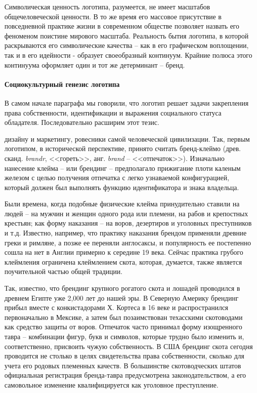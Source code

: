 Символическая ценность логотипа, разумеется, не имеет масштабов общечеловеческой ценности.
В то же время его массовое присутствие в повседневной практике жизни в современном
обществе позволяет назвать его феноменом поистине мирового масштаба. Реальность
бытия логотипа, в которой раскрываются его символические качества -- как в его графическом
воплощении, так и в его идейности - образует своеобразный континуум.
Крайние полюса этого континуума оформляет один и тот же детерминант -- бренд.

\paragraph{Социокультурный генезис логотипа}

В самом начале параграфа мы говорили, что логотип решает задачи закрепления права
собственности, идентификации и выражения социального статуса обладателя.
Последовательно расширим этот тезис.

дизайну и маркетингу, ровесники самой человеческой цивилизации. Так, первым логотипом,
в исторической перспективе, принято считать бренд-клеймо (древ. сканд. \emph{brandr},
<<гореть>>, анг. \emph{brand} -- <<отпечаток>>).
\autocite{markritson}\autocite{colapinto2011}\autocite{tradetimeline}\autocite{zapenko2007}
Изначально нанесение клейма -- или брендинг -- предполагало прижигание плоти
каленым железом с целью получения отпечатка с легко узнаваемой конфигурацией,
который должен был выполнять функцию идентификатора и знака владельца.

Были времена, когда подобные физические клейма принудительно ставили на людей --
на мужчин и женщин одного рода или племени, на рабов и крепостных крестьян;
как форму наказания -- на воров, дезертиров и уголовных преступников и т.д.
Известно, например, что практику наказания брендом применяли древние греки и
римляне, а позже ее переняли англосаксы, и популярность ее постепенно сошла на
нет в Англии примерно к середине 19 века. Сейчас практика грубого клеймления ограничена
клеймлением скота, которая, думается, также является поучительной  частью общей традиции.

Так, известно, что брендинг крупного рогатого скота и лошадей проводился в древнем
Египте уже 2,000 лет до нашей эры. В Северную Америку брендинг прибыл вместе с
конкистадорами Х. Кортеса в 16 веке и распространился первоначально в Мексике,
а затем был позаимствован техасскими скотоводами как средство защиты от воров.
Отпечаток часто принимал форму изощренного тавра -- комбинации фигур, букв и символов,
которые трудно было изменить и, соответственно, присвоить чужую собственность.
В США брендинг скота сегодня проводится не столько в целях свидетельства права
собственности, сколько для учета его родовых племенных качеств. В большинстве
скотоводческих штатов официальная регистрация бренда-тавра предусмотрена
законодательством, а его самовольное изменение квалифицируется как уголовное
преступление.\autocite{1994encarta}

